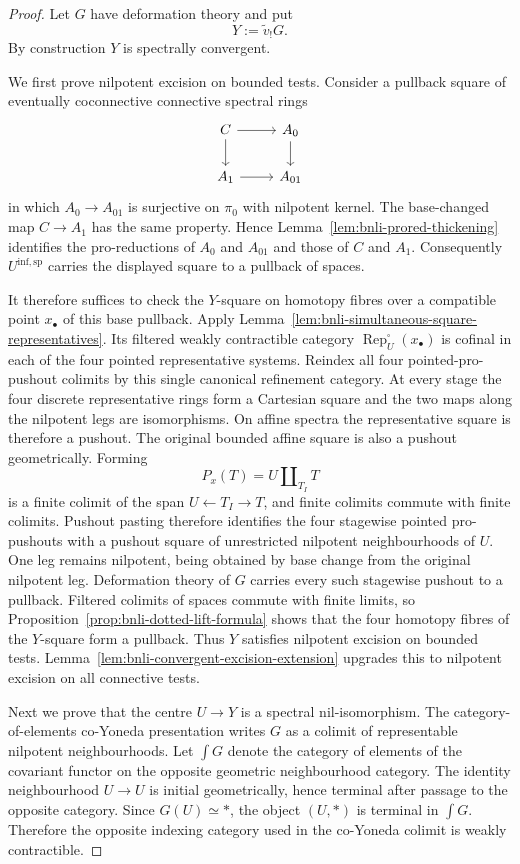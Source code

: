 \begin{proof}
Let $G$ have deformation theory and put
\[
    Y:=\widetilde v_!G.
\]
By construction $Y$ is spectrally convergent.

We first prove nilpotent excision on bounded tests.  Consider a pullback
square of eventually coconnective connective spectral rings
\[
\begin{tikzcd}
C \arrow[r] \arrow[d] &
A_0 \arrow[d]\\
A_1 \arrow[r] &
A_{01}
\end{tikzcd}
\]
in which $A_0\to A_{01}$ is surjective on $\pi_0$ with nilpotent kernel.
The base-changed map $C\to A_1$ has the same property.  Hence
Lemma~\ref{lem:bnli-prored-thickening} identifies the pro-reductions of
$A_0$ and $A_{01}$ and those of $C$ and $A_1$.  Consequently
$U^{\mathrm{inf,sp}}$ carries the displayed square to a pullback of spaces.

It therefore suffices to check the $Y$-square on homotopy fibres over a
compatible point $x_\bullet$ of this base pullback.  Apply
Lemma~\ref{lem:bnli-simultaneous-square-representatives}.  Its filtered
weakly contractible category
$\operatorname{Rep}^{\square}_U(x_\bullet)$ is cofinal in each of the four
pointed representative systems.  Reindex all four pointed-pro-pushout colimits by this single canonical
refinement category.  At every stage the four discrete representative rings
form a Cartesian square and the two maps along the nilpotent legs are
isomorphisms.  On affine spectra the representative square is therefore a
pushout.  The original bounded affine square is also a pushout geometrically.
Forming
\[
    P_x(T)=U\amalg_{T_I}T
\]
is a finite colimit of the span $U\leftarrow T_I\to T$, and finite colimits
commute with finite colimits.  Pushout pasting therefore identifies the four
stagewise pointed pro-pushouts with a pushout square of unrestricted
nilpotent neighbourhoods of $U$.  One leg remains nilpotent, being obtained by
base change from the original nilpotent leg.  Deformation theory of $G$
carries every such stagewise pushout to a pullback.  Filtered colimits of
spaces commute with finite limits, so
Proposition~\ref{prop:bnli-dotted-lift-formula} shows that the four homotopy
fibres of the $Y$-square form a pullback.  Thus $Y$ satisfies nilpotent
excision on bounded tests.  Lemma~\ref{lem:bnli-convergent-excision-extension}
upgrades this to nilpotent excision on all connective tests.

Next we prove that the centre $U\to Y$ is a spectral nil-isomorphism.  The
category-of-elements co-Yoneda presentation writes $G$ as a colimit of
representable nilpotent neighbourhoods.  Let $\int G$ denote the category of
elements of the covariant functor on the opposite geometric neighbourhood
category.  The identity neighbourhood $U\to U$ is initial geometrically,
hence terminal after passage to the opposite category.  Since $G(U)\simeq *$,
the object $(U,*)$ is terminal in $\int G$.  Therefore the opposite indexing
category used in the co-Yoneda colimit is weakly contractible.


\end{proof}
